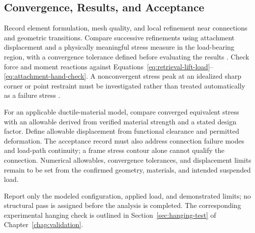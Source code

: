 \subsection{Convergence, Results, and Acceptance}
Record element formulation, mesh quality, and local refinement near connections and geometric transitions. Compare successive refinements using attachment displacement and a physically meaningful stress measure in the load-bearing region, with a convergence tolerance defined before evaluating the results \citep{ansysMeshConvergence}. Check force and moment reactions against Equations~\ref{eq:retrieval-lift-load}--\ref{eq:attachment-hand-check}. A nonconvergent stress peak at an idealized sharp corner or point restraint must be investigated rather than treated automatically as a failure stress \citep{ansysStressSingularity}.

For an applicable ductile-material model, compare converged equivalent stress with an allowable derived from verified material strength and a stated design factor. Define allowable displacement from functional clearance and permitted deformation. The acceptance record must also address connection failure modes and load-path continuity; a frame stress contour alone cannot qualify the connection. Numerical allowables, convergence tolerances, and displacement limits remain to be set from the confirmed geometry, materials, and intended suspended load.


Report only the modeled configuration, applied load, and demonstrated limits; no structural pass is assigned before the analysis is completed. The corresponding experimental hanging check is outlined in Section~\ref{sec:hanging-test} of Chapter~\ref{chap:validation}.

\par
\endgroup
